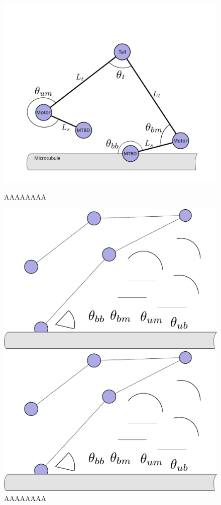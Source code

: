 \documentclass{article}
\begin{document}
\begin{figure}
 \begin{minipage}{.3\textwidth}
   \centering
   \includegraphics[width=\linewidth]{figures/schematic-1-model}
   \caption{AAAAAAAA}
   \label{fig:explengths}
 \end{minipage}
 \begin{minipage}{.5\textwidth}
   \centering
   \includegraphics[width=\linewidth]{figures/ob_fig}
   \caption{AAAAAAAA}
   \label{fig:modangles}
 \end{minipage}%
 \begin{minipage}{.5\textwidth}
   \centering
   \includegraphics[width=\linewidth]{figures/ob_fig}

\end{minipage}
\end{figure}
\end{document}
